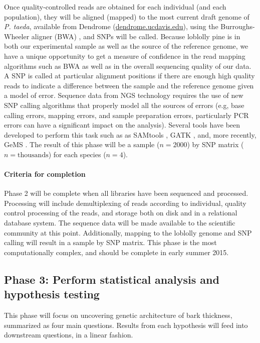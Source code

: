 Once quality-controlled reads are obtained for each individual (and each population), they will be aligned (mapped) to the 
most current draft genome of \emph{P. taeda}, available from Dendrome (\url{dendrome.ucdavis.edu}), using the Burroughs-Wheeler aligner 
(BWA) \citep{Li:2009fi}, and SNPs will be called.  Because loblolly pine is in both our experimental sample as well as the source 
of the reference genome, we have a unique opportunity to get a measure of confidence in the read mapping algorithms such as 
BWA as well as in the overall sequencing quality of our data.  A SNP is called at particular alignment positions if there are enough 
high quality reads to indicate a difference between the sample and the reference genome given a model of error. Sequence data 
from NGS technology requires the use of new SNP calling algorithms that properly model all the sources of errors (e.g, base 
calling errors, mapping errors, and sample preparation errors, particularly PCR errors can have a significant impact on the analysis).
Several tools have been developed to perform this task such as as SAMtools \citep{Li:2009ka}, GATK \citep{McKenna:2010bv}, and, 
more recently, GeMS \citep{You:2012iy}.   The result of this phase will be a sample ($n = 2000$) by SNP matrix ($n = \text{thousands}$) for each 
species ($n = 4$).  

\paragraph{Criteria for completion} Phase 2 will be complete when all libraries have been sequenced and processed.  Processing 
will include demultiplexing of reads according to individual, quality control processing of the reads, and storage both on disk and 
in a relational database system.  The sequence data will be made available to the scientific community at this point.  Additionally, 
mapping to the loblolly genome and SNP calling will result in a sample by SNP matrix.  This phase is the most computationally 
complex, and should be complete in early summer 2015.  

\subsection*{Phase 3: Perform statistical analysis and hypothesis testing}

This phase will focus on uncovering genetic architecture of bark thickness, summarized as four main questions.  Results 
from each hypothesis will feed into downstream questions, in a linear fashion.

